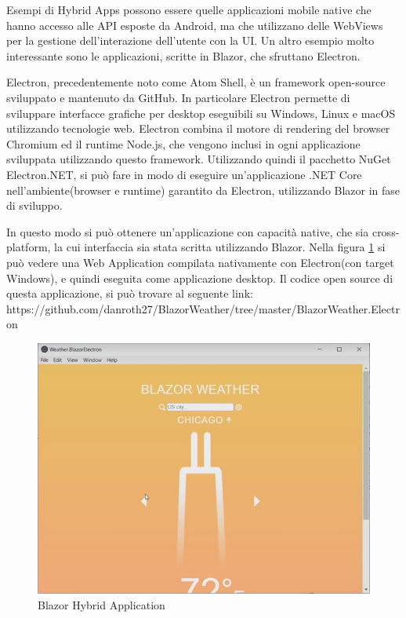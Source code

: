 Esempi di Hybrid Apps possono essere quelle applicazioni mobile native che hanno accesso alle API esposte da Android, ma che utilizzano delle WebViews per la gestione dell'interazione dell'utente con la UI.
Un altro esempio molto interessante sono le applicazioni, scritte in Blazor, che sfruttano Electron.

Electron, precedentemente noto come Atom Shell, \`e un framework open-source sviluppato e mantenuto da GitHub.
In particolare Electron permette di sviluppare interfacce grafiche per desktop eseguibili su Windows, Linux e macOS utilizzando tecnologie web\cite{electronWiki}.
Electron combina il motore di rendering del browser Chromium ed il runtime Node.js, che vengono inclusi in ogni applicazione sviluppata utilizzando questo framework.
Utilizzando quindi il pacchetto NuGet Electron.NET, si pu\`o fare in modo di eseguire un'applicazione .NET Core nell'ambiente(browser e runtime) garantito da Electron, utilizzando Blazor in fase di sviluppo\cite{electronDotNet}.

In questo modo si pu\`o ottenere un'applicazione con capacit\`a native, che sia cross-platform, la cui interfaccia sia stata scritta utilizzando Blazor.
Nella figura \ref{fig:BlazorHybridApplication} si pu\`o vedere una Web Application compilata nativamente con Electron(con target Windows), e quindi eseguita come applicazione desktop.
Il codice open source di questa applicazione, si pu\`o trovare al seguente link: https://github.com/danroth27/BlazorWeather/tree/master/BlazorWeather.Electron

\begin{figure}[H]
	\centerline{\includegraphics[scale=0.5]{figure/BlazorWeatherElectron.png}}
	\caption{Blazor Hybrid Application}
	\label{fig:BlazorHybridApplication}
\end{figure}

